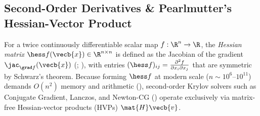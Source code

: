 \documentclass[../../../../master.tex]{subfiles}
\begin{document}
\subsection{Second-Order Derivatives \& Pearlmutter's Hessian-Vector Product}
\label{subsec:matcalc:hvp}

For a twice continuously differentiable scalar map $f : \R^n \to \R$, the \emph{Hessian matrix} $\hess f(\vecb{x}) \in \R^{n\times n}$ is defined as the Jacobian of the gradient $\jac_{\grad f}(\vecb{x})$ (; ), with entries $(\hess f)_{ij} = \frac{\partial^2 f}{\partial x_i \partial x_j}$ that are symmetric by Schwarz's theorem. Because forming $\hess f$ at modern scale ($n \sim 10^6\text{--}10^{11}$) demands $O(n^2)$ memory and arithmetic (), second-order Krylov solvers such as Conjugate Gradient, Lanczos, and Newton-CG () operate exclusively via matrix-free Hessian-vector products (HVPs) $\mat{H}\vecb{v}$.
\end{document}
